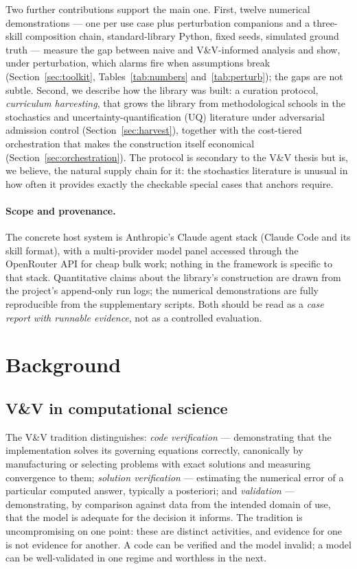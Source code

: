 \documentclass[11pt,a4paper]{article}
\begin{document}
Two further contributions support the main one. First, twelve numerical
demonstrations --- one per use case plus perturbation companions and a
three-skill composition chain, standard-library Python, fixed seeds,
simulated ground truth --- measure the gap between naive and V\&V-informed
analysis and show, under perturbation, which alarms fire when assumptions
break (Section~\ref{sec:toolkit}, Tables~\ref{tab:numbers}
and~\ref{tab:perturb}); the gaps are not subtle. Second, we describe how the library was built: a curation
protocol, \emph{curriculum harvesting}, that grows the library from
methodological schools in the stochastics and uncertainty-quantification
(UQ) literature under adversarial admission control
(Section~\ref{sec:harvest}), together with the cost-tiered orchestration
that makes the construction itself economical
(Section~\ref{sec:orchestration}). The protocol is secondary to the V\&V
thesis but is, we believe, the natural supply chain for it: the stochastics
literature is unusual in how often it provides exactly the checkable
special cases that anchors require.

\paragraph{Scope and provenance.} The concrete host system is Anthropic's
Claude agent stack (Claude Code and its skill format), with a
multi-provider model panel accessed through the OpenRouter API for cheap
bulk work; nothing in the framework is specific to that stack.
Quantitative claims about the library's construction are drawn from the
project's append-only run logs; the numerical demonstrations are fully
reproducible from the supplementary scripts. Both should be read as a
\emph{case report with runnable evidence}, not as a controlled evaluation.

\section{Background}\label{sec:background}

\subsection{V\&V in computational science}

The V\&V tradition \citep{roache1998,oberkampf2010,sargent2013}
distinguishes: \emph{code verification} --- demonstrating that the
implementation solves its governing equations correctly, canonically by
manufacturing or selecting problems with exact solutions and measuring
convergence to them; \emph{solution verification} --- estimating the
numerical error of a particular computed answer, typically a posteriori;
and \emph{validation} --- demonstrating, by comparison against data from
the intended domain of use, that the model is adequate for the decision it
informs. The tradition is uncompromising on one point: these are distinct
activities, and evidence for one is not evidence for another. A code can be
verified and the model invalid; a model can be well-validated in one regime
and worthless in the next.
\end{document}
